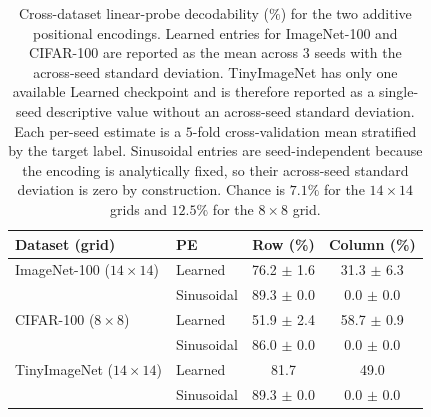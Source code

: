 \begin{table}[!t]
\centering
\caption{Cross-dataset linear-probe decodability ($\%$) for the two additive positional encodings. Learned entries for ImageNet-100 and CIFAR-100 are reported as the mean across $3$ seeds with the across-seed standard deviation. TinyImageNet has only one available Learned checkpoint and is therefore reported as a single-seed descriptive value without an across-seed standard deviation. Each per-seed estimate is a $5$-fold cross-validation mean stratified by the target label. Sinusoidal entries are seed-independent because the encoding is analytically fixed, so their across-seed standard deviation is zero by construction. Chance is $7.1\%$ for the $14{\times}14$ grids and $12.5\%$ for the $8{\times}8$ grid.}
\label{tab:supp-probes}
\begin{tabular}{llcc}
\hline
Dataset (grid) & PE & Row (\%) & Column (\%) \\
\hline
ImageNet-100 ($14{\times}14$) & Learned & 76.2 $\pm$ 1.6 & 31.3 $\pm$ 6.3 \\
 & Sinusoidal & 89.3 $\pm$ 0.0 & 0.0 $\pm$ 0.0 \\
\hline
CIFAR-100 ($8{\times}8$) & Learned & 51.9 $\pm$ 2.4 & 58.7 $\pm$ 0.9 \\
 & Sinusoidal & 86.0 $\pm$ 0.0 & 0.0 $\pm$ 0.0 \\
\hline
TinyImageNet ($14{\times}14$) & Learned & 81.7 & 49.0 \\
 & Sinusoidal & 89.3 $\pm$ 0.0 & 0.0 $\pm$ 0.0 \\
\hline
\end{tabular}
\end{table}
